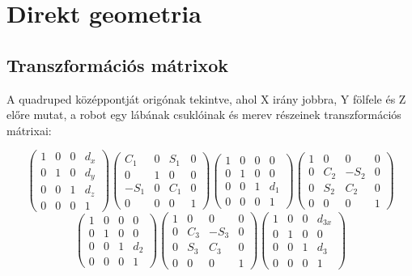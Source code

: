 \documentclass{article}
\begin{document}
\section{Direkt geometria}
\subsection{Transzformációs mátrixok}
A quadruped középpontját origónak tekintve, ahol X irány jobbra, Y fölfele és Z előre mutat, a robot egy lábának csuklóinak és merev részeinek transzformációs mátrixai:

$$
\begin{pmatrix}
	1&0&0&d_x\\
	0&1&0&d_y\\
	0&0&1&d_z\\
	0&0&0&1
\end{pmatrix}	
\begin{pmatrix}
	C_1&0&S_1&0\\
	0&1&0&0\\
	-S_1&0&C_1&0\\
	0&0&0&1
\end{pmatrix}	
\begin{pmatrix}
	1&0&0&0\\
	0&1&0&0\\
	0&0&1&d_1\\
	0&0&0&1
\end{pmatrix}	
\begin{pmatrix}
	1&0&0&0\\
	0&C_2&-S_2&0\\
	0&S_2&C_2&0\\
	0&0&0&1
\end{pmatrix}
$$
$$
\begin{pmatrix}
	1&0&0&0\\
	0&1&0&0\\
	0&0&1&d_2\\
	0&0&0&1
\end{pmatrix}	
\begin{pmatrix}
	1&0&0&0\\
	0&C_3&-S_3&0\\
	0&S_3&C_3&0\\
	0&0&0&1
\end{pmatrix}	
\begin{pmatrix}
	1&0&0&d_{3x}\\
	0&1&0&0\\
	0&0&1&d_3\\
	0&0&0&1
\end{pmatrix}
$$
\end{document}
